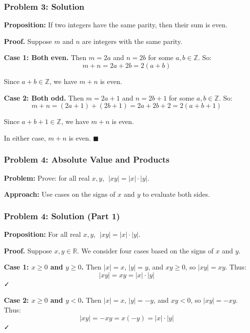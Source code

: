 \documentclass{beamer}
\begin{document}
\begin{frame}
  \frametitle{Problem 3: Solution}

  {\color{darkmaroon}\textbf{Proposition:}} If two integers have the same parity, then their sum is even.

  \vspace{0.2cm}
  {\color{darkmaroon}\textbf{Proof.}} Suppose $m$ and $n$ are integers with the same parity.

  \vspace{0.2cm}
  \textbf{Case 1: Both even.} Then $m = 2a$ and $n = 2b$ for some $a, b \in \mathbb{Z}$. So:
  $$m + n = 2a + 2b = 2(a + b)$$

  Since $a + b \in \mathbb{Z}$, we have $m + n$ is even.

  \vspace{0.3cm}
  \textbf{Case 2: Both odd.} Then $m = 2a + 1$ and $n = 2b + 1$ for some $a, b \in \mathbb{Z}$. So:
  $$m + n = (2a + 1) + (2b + 1) = 2a + 2b + 2 = 2(a + b + 1)$$

  Since $a + b + 1 \in \mathbb{Z}$, we have $m + n$ is even.

  \vspace{0.2cm}
  In either case, $m + n$ is even. \hfill $\blacksquare$
\end{frame}

\begin{frame}
  \frametitle{Problem 4: Absolute Value and Products}

  {\color{maroon}\textbf{Problem:}} Prove: for all real $x, y$, $\;|xy| = |x| \cdot |y|$.

  \vspace{0.3cm}
  {\color{maroon}\textbf{Approach:}} Use cases on the signs of $x$ and $y$ to evaluate both sides.
\end{frame}

\begin{frame}
  \frametitle{Problem 4: Solution (Part 1)}

  {\color{darkmaroon}\textbf{Proposition:}} For all real $x, y$, $\;|xy| = |x| \cdot |y|$.

  \vspace{0.2cm}
  {\color{darkmaroon}\textbf{Proof.}} Suppose $x, y \in \mathbb{R}$. We consider four cases based on the signs of $x$ and $y$.

  \vspace{0.2cm}
  \textbf{Case 1: $x \geq 0$ and $y \geq 0$.} Then $|x| = x$, $|y| = y$, and $xy \geq 0$, so $|xy| = xy$. Thus:
  $$|xy| = xy = |x| \cdot |y|$$ ✓

  \vspace{0.2cm}
  \textbf{Case 2: $x \geq 0$ and $y < 0$.} Then $|x| = x$, $|y| = -y$, and $xy < 0$, so $|xy| = -xy$. Thus:
  $$|xy| = -xy = x(-y) = |x| \cdot |y|$$ ✓
\end{frame}
\end{document}
